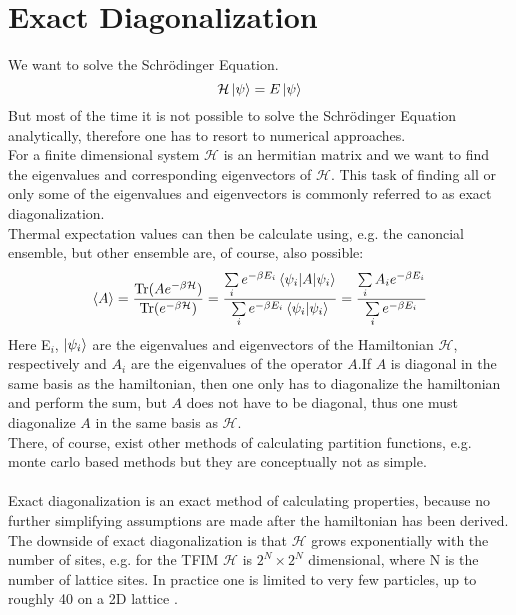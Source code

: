 \documentclass{article}
\begin{document}
\section{Exact Diagonalization}
We want to solve the Schr\"odinger Equation.
\begin{equation}
\label{eq:1}
\mathcal{H} \ket{\psi} = E \ket{\psi}
\end{equation}
But most of the time it is not possible to solve the Schr\"odinger
Equation analytically, therefore one has to resort to numerical
approaches.\\
For a finite dimensional system $\mathcal{H}$ is an hermitian matrix
and we want to find the eigenvalues and corresponding eigenvectors of $\mathcal{H}$.
This task of finding all or only some of the eigenvalues and
eigenvectors is commonly referred to as exact diagonalization.\\
Thermal expectation values can then be calculate using, e.g. the
canoncial ensemble, but other ensemble are, of course, also possible:
\begin{equation}
\label{eq:2}
\braket{A} = \frac{ \text{Tr}(Ae^{-\beta \mathcal H})}{ \text{Tr}(e^{-\beta \mathcal
    H})} = \frac{\sum\limits_i e^{-\beta
      E_{i}} \braket{\psi_i|A|\psi_{i}}}{\sum\limits_i e^{-\beta
      E_i} \braket{\psi_i|\psi_{i}}} = \frac{\sum\limits_i A_i e^{-\beta
      E_{i}}}{\sum\limits_i e^{-\beta
      E_i}}
\end{equation}
Here E$_{i}$, $\ket{\psi_i}$ are the eigenvalues and  eigenvectors of
the Hamiltonian $\mathcal{H}$, respectively and $A_i$ are the
eigenvalues of the operator $A$.If $A$ is diagonal in the same basis as
the hamiltonian, then one only has to diagonalize the hamiltonian and
perform the sum, but $A$ does not have to be diagonal, thus one must
diagonalize $A$ in the same basis as $\mathcal{H}$.\\
There, of course, exist other methods
of calculating partition functions, e.g. monte carlo based methods but they
are conceptually not as simple.\\
\\
Exact diagonalization is an exact method of calculating properties,
because no further simplifying assumptions are made after the
hamiltonian has been derived.\\
The downside of exact diagonalization is that $\mathcal{H}$ grows
exponentially with the number of sites, e.g. for the TFIM
$\mathcal{H}$ is $2^N \times 2^N$ dimensional, where N is the number
of lattice sites. In practice one is limited to very
few particles, up to roughly 40 on a 2D lattice \cite{Noack}.\\
\end{document}
